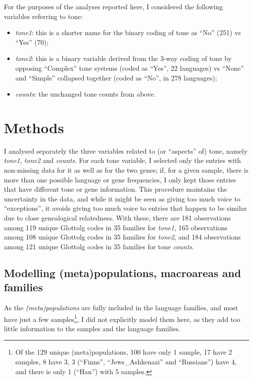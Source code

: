 \documentclass[twoside,onecolumn]{article}
\begin{document}
For the purposes of the analyses reported here, I considered the following variables referring to tone:

\begin{itemize}
  \item \emph{tone1}: this is a shorter name for the binary coding of tone as ``No'' (251) vs ``Yes'' (70);
  \item \emph{tone2}: this is a binary variable derived from the 3-way coding of tone by opposing ``Complex'' tone systems (coded as ``Yes'', 22 languages) vs ``None'' and ``Simple'' collapsed together (coded as ``No'', in 278 languages);
  \item \emph{counts}: the unchanged tone counts from above.
\end{itemize}




\section{Methods}

I analysed separately the three variables related to (or ``aspects'' of) tone, namely \textit{tone1}, \textit{tone2} and \textit{counts}.
For each tone variable, I selected only the entries with non-missing data for it as well as for the two genes; if, for a given sample, there is more than one possible language or gene frequencies, I only kept those entries that have different tone or gene information.
This procedure maintains the uncertainty in the data, and while it might be seen as giving too much voice to ``exceptions'', it avoids giving too much voice to entries that happen to be similar due to close genealogical relatedness.
With these, there are 181 observations among 119 unique Glottolg codes in 35 families for \textit{tone1}, 165 observations among 108 unique Glottolg codes in 35 families for \textit{tone2}, and 184 observations among 121 unique Glottolg codes in 35 families for tone \textit{counts}.


\subsection{Modelling (meta)populations, macroareas and families}

As the \emph{(meta)populations} are fully included in the language families, and most have just a few samples\footnote{Of the 129 unique (meta)populations, 100 have only 1 sample, 17 have 2 samples, 8 have 3, 3 (``Finns'', ``Jews\_Ashkenazi'' and ``Russians'') have 4, and there is only 1 (``Han'') with 5 samples.}, I did not explicitly model them here, as they add too little information to the samples and the language families.
\end{document}
